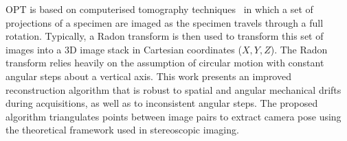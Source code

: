 \documentclass[times, twoside, watermark]{zHenriquesLab-StyleBioRxiv}
\begin{document}

\gls{OPT} is based on computerised tomography techniques~\cite{kakPrinciplesComputerizedTomographic2001} in which a set of projections of a specimen are imaged as the specimen travels through a full rotation.
Typically, a Radon transform is then used to transform this set of images into a 3D image stack in Cartesian coordinates (\(X,Y,Z\)).
The \gls{Radon transform} relies heavily on the assumption of circular motion with constant angular steps about a vertical axis.
This work presents an improved reconstruction algorithm that is robust to spatial and angular mechanical drifts during acquisitions, as well as to inconsistent angular steps.
The proposed algorithm triangulates points between image pairs to extract camera pose using the theoretical framework used in stereoscopic imaging. %

%
\end{document}

